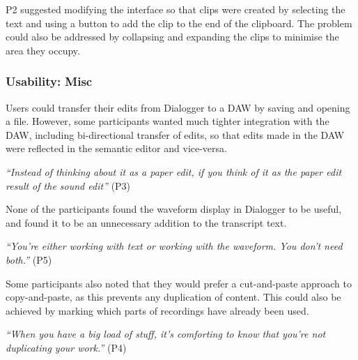 P2 suggested modifying the interface so that clips were created by selecting the text and using a button to add the
clip to the end of the clipboard. The problem could also be addressed by collapsing and expanding the clips to minimise
the area they occupy.


\subsubsection{Usability: Misc}

Users could transfer their edits from Dialogger to a DAW by saving and opening a file. However, some
participants wanted much tighter integration with the DAW, including bi-directional transfer of edits, so that edits
made in the DAW were reflected in the semantic editor and vice-versa.

\textit{``Instead of thinking about it as a paper edit, if you think of it as the paper edit result of the sound
  edit''} (P3)

None of the participants found the waveform display in Dialogger to be useful, and found it to be an
unnecessary addition to the transcript text.

\textit{``You're either working with text or working with the waveform. You don't need both.''} (P5)

Some participants also noted that they would prefer a cut-and-paste approach to copy-and-paste, as this prevents any
duplication of content. This could also be achieved by marking which parts of recordings have already been used.

\textit{``When you have a big load of stuff, it's comforting to know that you're not duplicating your work.''} (P4)



